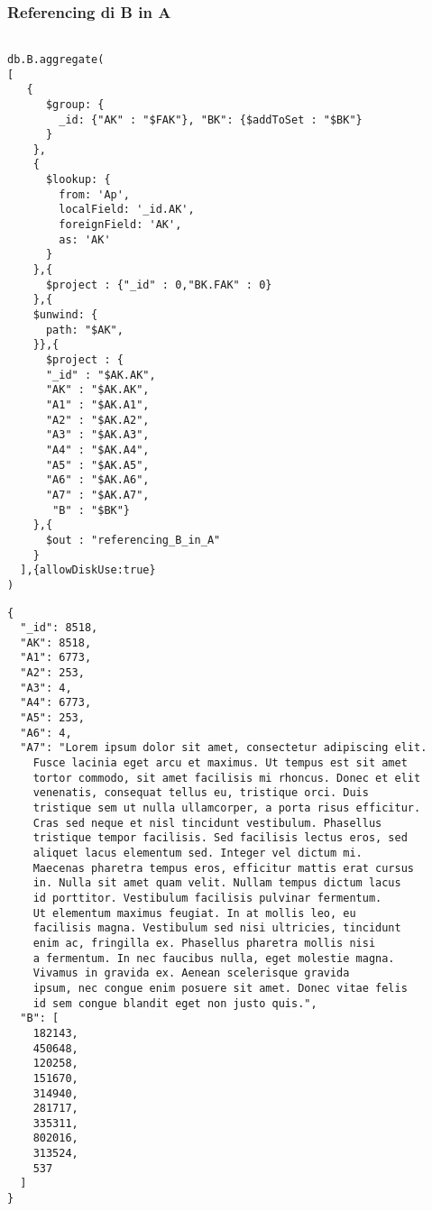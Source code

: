 \subsubsection{Referencing di B in A}

\begin{verbatim}
    
db.B.aggregate(
[
   {
      $group: {
        _id: {"AK" : "$FAK"}, "BK": {$addToSet : "$BK"}
      }
    },
    {
      $lookup: {
        from: 'Ap',
        localField: '_id.AK',
        foreignField: 'AK',
        as: 'AK'
      }
    },{
      $project : {"_id" : 0,"BK.FAK" : 0}
    },{
    $unwind: {
      path: "$AK",
    }},{
      $project : {
      "_id" : "$AK.AK",
      "AK" : "$AK.AK",
      "A1" : "$AK.A1", 
      "A2" : "$AK.A2", 
      "A3" : "$AK.A3", 
      "A4" : "$AK.A4",
      "A5" : "$AK.A5",
      "A6" : "$AK.A6",
      "A7" : "$AK.A7",
       "B" : "$BK"} 
    },{
      $out : "referencing_B_in_A"
    }
  ],{allowDiskUse:true}
)
\end{verbatim}

\begin{Verbatim}[frame=single,framesep=2mm,label= Referencing di B in A,labelposition=all]
{
  "_id": 8518,
  "AK": 8518,
  "A1": 6773,
  "A2": 253,
  "A3": 4,
  "A4": 6773,
  "A5": 253,
  "A6": 4,
  "A7": "Lorem ipsum dolor sit amet, consectetur adipiscing elit. 
    Fusce lacinia eget arcu et maximus. Ut tempus est sit amet 
    tortor commodo, sit amet facilisis mi rhoncus. Donec et elit
    venenatis, consequat tellus eu, tristique orci. Duis 
    tristique sem ut nulla ullamcorper, a porta risus efficitur.
    Cras sed neque et nisl tincidunt vestibulum. Phasellus 
    tristique tempor facilisis. Sed facilisis lectus eros, sed 
    aliquet lacus elementum sed. Integer vel dictum mi. 
    Maecenas pharetra tempus eros, efficitur mattis erat cursus
    in. Nulla sit amet quam velit. Nullam tempus dictum lacus
    id porttitor. Vestibulum facilisis pulvinar fermentum.
    Ut elementum maximus feugiat. In at mollis leo, eu 
    facilisis magna. Vestibulum sed nisi ultricies, tincidunt
    enim ac, fringilla ex. Phasellus pharetra mollis nisi
    a fermentum. In nec faucibus nulla, eget molestie magna.
    Vivamus in gravida ex. Aenean scelerisque gravida 
    ipsum, nec congue enim posuere sit amet. Donec vitae felis
    id sem congue blandit eget non justo quis.",
  "B": [
    182143,
    450648,
    120258,
    151670,
    314940,
    281717,
    335311,
    802016,
    313524,
    537
  ]
}
\end{Verbatim}

